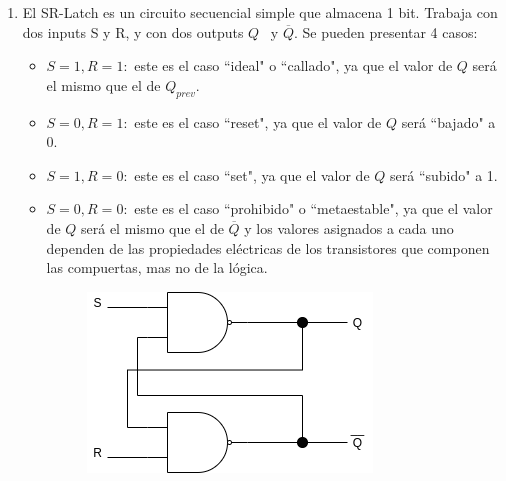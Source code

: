\documentclass[11pt,a4paper]{article}
\begin{document}
\begin{enumerate}
\item El SR-Latch es un circuito secuencial simple que almacena 1 bit. Trabaja con dos inputs S y R, y con  dos outputs $Q $ \ y $\overline{Q}$. Se pueden presentar 4 casos:
\begin{itemize}
\item $S = 1, R = 1:$ este es el caso ``ideal" o ``callado", ya que el valor de $Q$ será el mismo que el de $Q_{prev}$.
\item $S = 0, R = 1:$ este es el caso ``reset", ya que el valor de $Q$ será ``bajado" a 0.
\item $S = 1, R = 0:$ este es el caso ``set", ya que el valor de $Q$ será ``subido" a 1.
\item $S = 0, R = 0:$ este es el caso ``prohibido" o ``metaestable", ya que el valor de $Q$ será el mismo que el de $\overline{Q}$ y los valores asignados a cada uno dependen de las propiedades eléctricas de los transistores que componen las compuertas, mas no de la lógica.
\begin{figure}[h!]
\centering
\includegraphics[scale=0.6]{8.png} 
\end{figure}

\end{itemize}

\end{enumerate}
\end{document}
